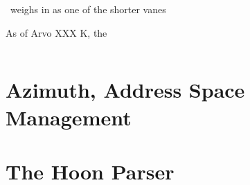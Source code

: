 
\jael~weighs in as one of the shorter vanes

As of Arvo XXX K, the

\begin{lstlisting}

\end{lstlisting}

\section[Azimuth]{Azimuth, Address Space Management}

\section[Hoon Parser]{The Hoon Parser}
